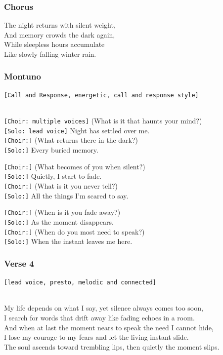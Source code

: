 \documentclass[]{article}
\begin{document}
\subsubsection{Chorus}\label{chorus-61}

The night returns with silent weight,\\
And memory crowds the dark again,\\
While sleepless hours accumulate\\
Like slowly falling winter rain.

\subsubsection{Montuno}\label{montuno-1}

\texttt{{[}Call\ and\ Response,\ energetic,\ call\ and\ response\ style{]}}\strut \\
\texttt{{[}Choir:\ multiple\ voices{]}} (What is it that haunts your
mind?)\\
\texttt{{[}Solo:\ lead\ voice{]}} Night has settled over me.\\
\texttt{{[}Choir:{]}} (What returns there in the dark?)\\
\texttt{{[}Solo:{]}} Every buried memory.

\texttt{{[}Choir:{]}} (What becomes of you when silent?)\\
\texttt{{[}Solo:{]}} Quietly, I start to fade.\\
\texttt{{[}Choir:{]}} (What is it you never tell?)\\
\texttt{{[}Solo:{]}} All the things I'm scared to say.

\texttt{{[}Choir:{]}} (When is it you fade away?)\\
\texttt{{[}Solo:{]}} As the moment disappears.\\
\texttt{{[}Choir:{]}} (When do you most need to speak?)\\
\texttt{{[}Solo:{]}} When the instant leaves me here.

\subsubsection{Verse 4}\label{verse-4-7}

\texttt{{[}lead\ voice,\ presto,\ melodic\ and\ connected{]}}\strut \\
My life depends on what I say, yet silence always comes too soon,\\
I search for words that drift away like fading echoes in a room.\\
And when at last the moment nears to speak the need I cannot hide,\\
I lose my courage to my fears and let the living instant slide.\\
The soul ascends toward trembling lips, then quietly the moment slips.
\end{document}
